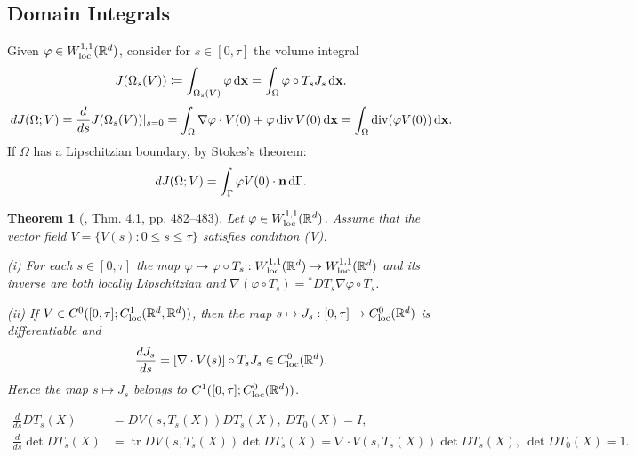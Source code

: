 \documentclass{article}
\newtheorem{theorem}{Theorem}
\begin{document}
\subsection{Domain Integrals}

\begin{itemize}
	\item Given $\varphi\in W_{\rm loc}^{1,1}(\mathbb{R}^d)$, consider for $s\in[0,\tau]$ the volume integral
	\begin{equation}
		J(\Omega_s(V))\coloneqq\int_{\Omega_s(V)} \varphi\,{\rm d}{\bf x} = \int_\Omega \varphi\circ T_sJ_s\,{\rm d}{\bf x}.
	\end{equation}
	\begin{equation}
		dJ(\Omega;V) = \frac{d}{ds}J(\Omega_s(V))|_{s = 0} = \int_\Omega \nabla\varphi\cdot V(0) + \varphi\operatorname{div}V(0)\,{\rm d}{\bf x} = \int_\Omega \operatorname{div}(\varphi V(0))\,{\rm d}{\bf x}.
	\end{equation}
	If $\Omega$ has a Lipschitzian boundary, by Stokes's theorem:
	\begin{equation}
		dJ(\Omega;V) = \int_\Gamma \varphi V(0)\cdot{\bf n}\,{\rm d}\Gamma.
	\end{equation}
	
	\begin{theorem}[\cite{Delfour_Zolesio2011}, Thm. 4.1, pp. 482--483]
		Let $\varphi\in W_{\rm loc}^{1,1}(\mathbb{R}^d)$. Assume that the vector field $V = \{V(s):0\le s\le\tau\}$ satisfies condition (V).
		\item[(i)] For each $s\in[0,\tau]$ the map $\varphi\mapsto\varphi\circ T_s:W_{\rm loc}^{1,1}(\mathbb{R}^d)\to W_{\rm loc}^{1,1}(\mathbb{R}^d)$ and its inverse are both locally Lipschitzian and $\nabla(\varphi\circ T_s) = {}^*DT_s\nabla\varphi\circ T_s$.
		\item[(ii)] If $V\in C^0([0,\tau];C_{\rm loc}^1(\mathbb{R}^d,\mathbb{R}^d))$, then the map $s\mapsto J_s:[0,\tau]\to C_{\rm loc}^0(\mathbb{R}^d)$ is differentiable and
		\begin{equation}
			\frac{dJ_s}{ds} = [\nabla\cdot V(s)]\circ T_sJ_s\in C_{\rm loc}^0(\mathbb{R}^d).
		\end{equation}
		Hence the map $s\mapsto J_s$ belongs to $C^1([0,\tau];C_{\rm loc}^0(\mathbb{R}^d))$.
	\end{theorem}
	
	\begin{align}
		\frac{d}{ds}DT_s(X) &= DV(s,T_s(X))DT_s(X),\ DT_0(X) = I,\\
		\frac{d}{ds}\det DT_s(X) &= \operatorname{tr}DV(s,T_s(X))\det DT_s(X) = \nabla\cdot V(s,T_s(X))\det DT_s(X),\ \det DT_0(X) = 1.
	\end{align}
	

\end{itemize}
\end{document}
